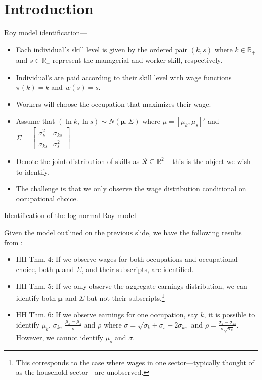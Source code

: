 \documentclass[aspectratio=169]{beamer}
\begin{document}
	\section{Introduction}
\begin{frame}{Roy model identification---\citet{heckman1990empirical}}
	\begin{itemize}
	\item Each individual's skill level is given by the ordered pair $(k,s)$ where $k\in\mathbb{R}_+$ and $s\in\mathbb{R}_+$ represent the managerial and worker skill, respectively. 
	\bigskip
	\item Individual's are paid according to their skill level with wage functions $\pi(k) = k$ and $w(s) = s$.
	\bigskip
	\item Workers will choose the occupation that maximizes their wage.
	\bigskip
	\item Assume that $(\ln k, \ln s) \sim N(\mathbf{\mu},\Sigma)$ where $\mu = [\mu_k,\mu_s]'$ and $\Sigma=\begin{bmatrix}
		\sigma_k^2 & \sigma_{ks} \\
		\sigma_{ks} & \sigma_s^2
	\end{bmatrix}$ 
	\bigskip
	\item Denote the joint distribution of skills as $\mathcal{R}\subseteq \mathbb{R}^2_+$---this is the object we wish to identify. 
	\bigskip
	\item The challenge is that we only observe the wage distribution conditional on occupational choice.
	\end{itemize}
\end{frame}

	\begin{frame}{Identification of the log-normal Roy model}
	\begin{theorem}
		Given the model outlined on the previous slide, we have the following results from \citet{heckman1990empirical}:
		\begin{itemize}
			\item HH Thm. 4: If we observe wages for both occupations and occupational choice, both $\mathbf{\mu}$ and $\Sigma$, and their subscripts, are identified.
			\smallskip
			\item  HH Thm. 5: If we only observe the aggregate earnings distribution, we can identify both $\mathbf{\mu}$ and $\Sigma$ but not their subscripts.\footnote{This corresponds to the case where wages in one sector---typically thought of as the household sector---are unobserved.}
			\smallskip
			\item HH Thm. 6: If we observe earnings for one occupation, say $k$, it is possible to identify $\mu_k$, $\sigma_k$, $\frac{\mu_k - \mu_s}{\sigma}$ and $\rho$ where $\sigma = \sqrt{\sigma_k + \sigma_s -2 \sigma_{ks}}$ and $\rho = \frac{\sigma_k - \sigma_{ks}}{\sigma\sqrt{\sigma_k}}$. However, we cannot identify $\mu_s$ and $\sigma$.
		\end{itemize}
	\end{theorem}
\end{frame}
\end{document}
